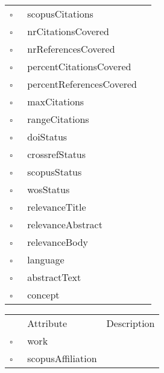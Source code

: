 \begin{table}
\begin{longtable}{llp{8cm}}
$\square$\ & scopusCitations &  \\
$\square$\ & nrCitationsCovered &  \\
$\square$\ & nrReferencesCovered &  \\
$\square$\ & percentCitationsCovered &  \\
$\square$\ & percentReferencesCovered &  \\
$\square$\ & maxCitations &  \\
$\square$\ & rangeCitations &  \\
$\square$\ & doiStatus &  \\
$\square$\ & crossrefStatus &  \\
$\square$\ & scopusStatus &  \\
$\square$\ & wosStatus &  \\
$\square$\ & relevanceTitle &  \\
$\square$\ & relevanceAbstract &  \\
$\square$\ & relevanceBody &  \\
$\square$\ & language &  \\
$\square$\ & abstractText &  \\
$\square$\ & concept &  \\
\end{longtable}
\label{attr:Work}
\end{table}

\begin{table}
\caption{WorkAffiliation  }

\begin{longtable}{llp{8cm}}
& Attribute & Description \\
$\square$\ & work &  \\
$\square$\ & scopusAffiliation &  \\
\end{longtable}
\label{attr:WorkAffiliation}
\end{table}
